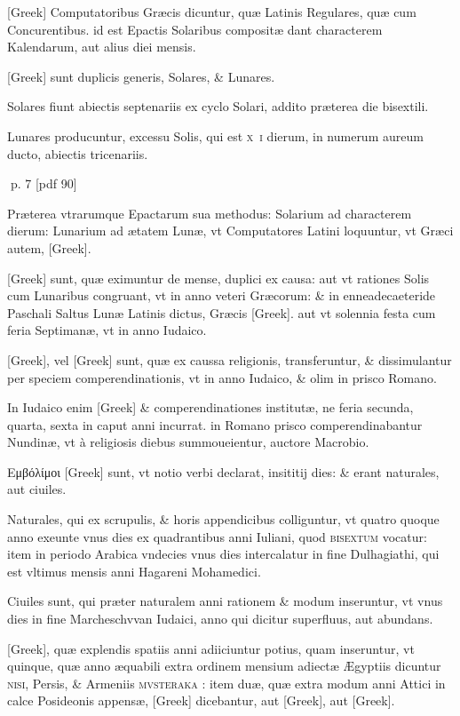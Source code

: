 \begin{parnumbers}
\textgreek{[Greek]} Computatoribus Græcis dicuntur, quæ Latinis Regulares, quæ cum  Concurentibus. id est Epactis Solaribus compositæ dant characterem Kalendarum, aut alius diei mensis.

\textgreek{[Greek]} sunt duplicis generis, Solares, \& Lunares.

Solares fiunt abiectis septenariis ex cyclo Solari, addito præterea die bisextili.

Lunares producuntur, excessu Solis, qui est \textsc{x~i} dierum, in numerum aureum ducto, abiectis tricenariis.

\end{parnumbers}
\clearpage
p. 7 [pdf 90]

\begin{parnumbers}

Præterea vtrarumque Epactarum sua methodus: Solarium ad characterem dierum: Lunarium ad ætatem Lunæ, vt Computatores Latini loquuntur, vt  Græci autem, \textgreek{[Greek]}.

\textgreek{[Greek]} sunt, quæ eximuntur de mense, duplici ex causa: aut vt rationes Solis cum Lunaribus congruant, vt in anno veteri Græcorum: \& in enneadecaeteride Paschali Saltus Lunæ Latinis dictus, Græcis \textgreek{[Greek]}. aut vt solennia festa cum feria Septimanæ, vt in anno Iudaico.

\textgreek{[Greek]}, vel \textgreek{[Greek]} sunt, quæ ex caussa religionis, transferuntur, \& dissimulantur per speciem comperendinationis, vt in anno Iudaico, \& olim in prisco Romano.

In Iudaico enim \textgreek{[Greek]} \& comperendinationes institutæ, ne feria secunda, quarta, sexta in caput anni incurrat. in Romano prisco comperendinabantur Nundinæ, vt à religiosis diebus summoueientur, auctore Macrobio.

\textgreek{Εμβόλίμοι [Greek]} sunt, vt notio verbi declarat, insititij  dies: \& erant naturales, aut ciuiles.

Naturales, qui ex scrupulis, \& horis appendicibus colliguntur, vt quatro quoque anno exeunte vnus dies ex quadrantibus anni Iuliani, quod \textsc{bisextum} vocatur: item in periodo Arabica vndecies vnus dies intercalatur in fine Dulhagiathi, qui est vltimus mensis anni Hagareni Mohamedici.

Ciuiles sunt, qui præter naturalem anni rationem \& modum inseruntur, vt vnus dies in fine Marcheschvvan Iudaici, anno qui dicitur superfluus, aut abundans.

\textgreek{[Greek]}, quæ explendis spatiis anni adiiciuntur potius, quam inseruntur, vt quinque, quæ anno æquabili extra ordinem mensium adiectæ Ægyptiis dicuntur \textsc{nisi}, Persis, \& Armeniis \textsc{mvsteraka} : item duæ, quæ extra modum anni Attici in calce Posideonis  appensæ, \textgreek{[Greek]} dicebantur, aut \textgreek{[Greek]}, aut \textgreek{[Greek]}.


\end{parnumbers}
